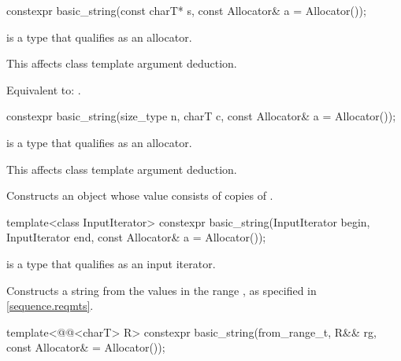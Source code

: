 %
\begin{itemdecl}
constexpr basic_string(const charT* s, const Allocator& a = Allocator());
\end{itemdecl}

\begin{itemdescr}
\pnum
\constraints
{} is a type
that qualifies as an allocator.
\begin{note}
This affects class template argument deduction.
\end{note}

\pnum
\effects
Equivalent to: .
\end{itemdescr}

%
\begin{itemdecl}
constexpr basic_string(size_type n, charT c, const Allocator& a = Allocator());
\end{itemdecl}

\begin{itemdescr}
\pnum
\constraints
{} is a type
that qualifies as an allocator.
\begin{note}
This affects class template argument deduction.
\end{note}

\pnum
\effects
Constructs an object whose value consists of  copies of .
\end{itemdescr}

%
\begin{itemdecl}
template<class InputIterator>
  constexpr basic_string(InputIterator begin, InputIterator end, const Allocator& a = Allocator());
\end{itemdecl}

\begin{itemdescr}
\pnum
\constraints
{} is a type that qualifies as an input
iterator.

\pnum
\effects
Constructs a string from the values in the range ,
as specified in \ref{sequence.reqmts}.
\end{itemdescr}

%
\begin{itemdecl}
template<@@<charT> R>
  constexpr basic_string(from_range_t, R&& rg, const Allocator& = Allocator());
\end{itemdecl}

